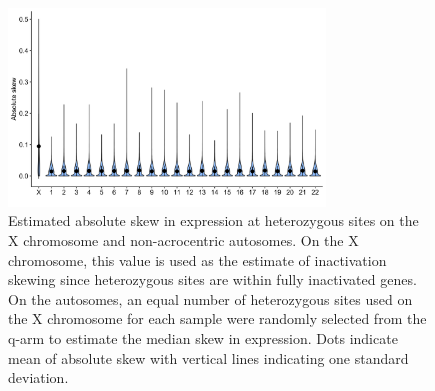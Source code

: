 \begin{figure}[ht]
    \centering
    \includegraphics[width=0.75\textwidth]{chapter4/Figures/Supplementary_Figure_3.png}
    \caption{
        Estimated absolute skew in expression at heterozygous sites on the X chromosome and non-acrocentric autosomes. On the X chromosome, this value is used as the estimate of inactivation skewing since heterozygous sites are within fully inactivated genes. On the autosomes, an equal number of heterozygous sites used on the X chromosome for each sample were randomly selected from the q-arm to estimate the median skew in expression. Dots indicate mean of absolute skew with vertical lines indicating one standard deviation.
    }
    \label{fig:supp_fig4.3}
\end{figure}